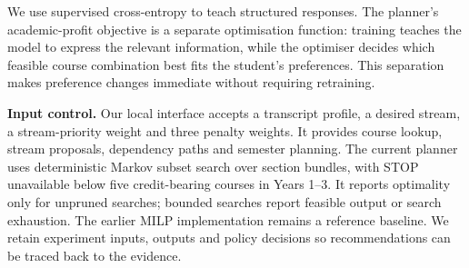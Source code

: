 \documentclass{article}
\begin{document}
We use supervised cross-entropy to teach structured responses. The planner's academic-profit objective is a separate optimisation function: training teaches the model to express the relevant information, while the optimiser decides which feasible course combination best fits the student's preferences. This separation makes preference changes immediate without requiring retraining.

\textbf{Input control.} Our local interface accepts a transcript profile, a desired stream, a stream-priority weight and three penalty weights. It provides course lookup, stream proposals, dependency paths and semester planning. The current planner uses deterministic Markov subset search over section bundles, with STOP unavailable below five credit-bearing courses in Years 1--3. It reports optimality only for unpruned searches; bounded searches report feasible output or search exhaustion. The earlier MILP implementation remains a reference baseline\citep{scipy}. We retain experiment inputs, outputs and policy decisions so recommendations can be traced back to the evidence\citep{runs}.
\end{document}
